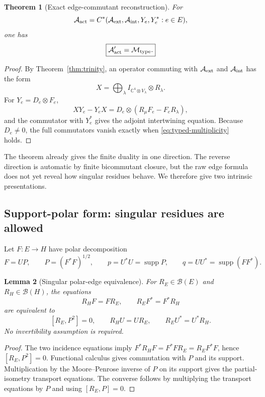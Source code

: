 \documentclass[11pt]{article}
\newtheorem{theorem}{Theorem}[section]
\newtheorem{lemma}[theorem]{Lemma}
\theoremstyle{definition}
\theoremstyle{remark}
\newcommand{\C}{\mathbb C}
\newcommand{\supp}{\operatorname{supp}}
\newcommand{\A}{\mathcal A}
\newcommand{\M}{\mathcal M}
\begin{document}
\begin{theorem}[Exact edge-commutant reconstruction]
\label{thm:edge-commutant}
For
\[
\A_{\rm act}
=
C^*(\A_{\rm ext},\A_{\rm int},Y_e,Y_e^*:e\in E),
\]
one has
\begin{equation}
\boxed{\A_{\rm act}'=\M_{\rm type}.}
\label{eq:edge-commutant}
\end{equation}
\end{theorem}

\begin{proof}
By Theorem~\ref{thm:trinity}, an operator commuting with
$\A_{\rm ext}$ and $\A_{\rm int}$ has the form
\[
X=
\bigoplus_\lambda
I_{\C^4\otimes V_\lambda}\otimes R_\lambda.
\]
For $Y_e=D_e\otimes F_e$,
\[
XY_e-Y_eX
=
D_e\otimes(R_\mu F_e-F_eR_\lambda),
\]
and the commutator with $Y_e^*$ gives the adjoint intertwining equation.
Because $D_e\ne0$, the full commutators vanish exactly when
\eqref{eq:typed-multiplicity} holds.
\end{proof}

The theorem already gives the finite duality in one direction.  The reverse
direction is automatic by finite bicommutant closure, but the raw edge formula
does not yet reveal how singular residues behave.  We therefore give two
intrinsic presentations.

\subsection{Support-polar form: singular residues are allowed}

Let $F:E\to H$ have polar decomposition
\[
F=UP,
\qquad
P=(F^*F)^{1/2},
\qquad
p=U^*U=\supp P,
\qquad
q=UU^*=\supp(FF^*).
\]

\begin{lemma}[Singular polar-edge equivalence]
\label{lem:polar-edge}
For $R_E\in\mathcal B(E)$ and $R_H\in\mathcal B(H)$, the equations
\[
R_HF=FR_E,
\qquad
R_EF^*=F^*R_H
\]
are equivalent to
\begin{equation}
\boxed{
[R_E,P^2]=0,
\qquad
R_HU=UR_E,
\qquad
R_EU^*=U^*R_H.}
\label{eq:polar-edge-equivalence}
\end{equation}
No invertibility assumption is required.
\end{lemma}

\begin{proof}
The two incidence equations imply
$F^*R_HF=F^*FR_E=R_EF^*F$, hence $[R_E,P^2]=0$.
Functional calculus gives commutation with $P$ and its support.
Multiplication by the Moore--Penrose inverse of $P$ on its support gives the
partial-isometry transport equations.  The converse follows by multiplying
the transport equations by $P$ and using $[R_E,P]=0$.
\end{proof}
\end{document}
